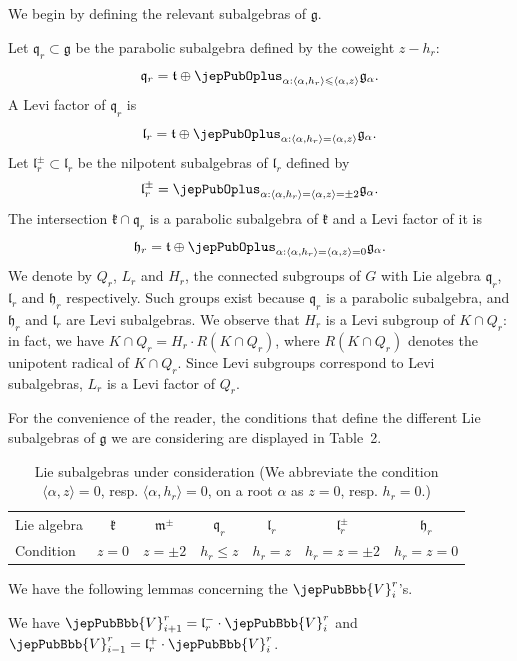 We begin by defining the relevant subalgebras of $\mathfrak g$.
\begin{notation}
Let $\mathfrak q_r\subset\mathfrak g$ be the parabolic subalgebra defined by the coweight $z-h_r$:
\[
\mathfrak q_r=\mathfrak t\oplus\jepPubOplus_{\alpha:\langle\alpha,h_r\rangle\leqslant\langle\alpha,z\rangle}\mathfrak g_\alpha.
\]
A Levi factor of $\mathfrak q_r$ is
\[
\mathfrak l_r=\mathfrak t\oplus\jepPubOplus_{\alpha:\langle\alpha,h_r\rangle=\langle\alpha,z\rangle}\mathfrak g_\alpha.
\]
Let $\mathfrak l_r^\pm\subset\mathfrak l_r$ be the nilpotent subalgebras of $\mathfrak l_r$ defined by
\[
\mathfrak l_r^\pm=\jepPubOplus_{\alpha:\langle\alpha,h_r\rangle=\langle\alpha,z\rangle=\pm2}\mathfrak g_\alpha.
\]
The intersection $\mathfrak k\cap\mathfrak q_r$ is a parabolic subalgebra of $\mathfrak k$ and a Levi factor of it is
\[
\mathfrak h_r=\mathfrak t\oplus\jepPubOplus_{\alpha:\langle\alpha,h_r\rangle=\langle\alpha,z\rangle=0}\mathfrak g_\alpha.
\]
We denote by $Q_r$, $L_r$ and $H_r$, the connected subgroups of $G$ with Lie algebra $\mathfrak q_r$, $\mathfrak l_r$ and $\mathfrak h_r$ respectively. Such groups exist because $\mathfrak q_r$ is a parabolic subalgebra, and $\mathfrak h_r$ and $\mathfrak l_r$ are Levi subalgebras. We observe that $H_r$ is a Levi subgroup of $K\cap Q_r$: in fact, we have $K\cap Q_r=H_r\cdot R(K\cap Q_r)$, where $R(K\cap Q_r)$ denotes the unipotent radical of $K\cap Q_r$. Since Levi subgroups correspond to Levi subalgebras, $L_r$ is a Levi factor of $Q_r$.
\end{notation}
For the convenience of the reader, the conditions that define the different Lie subalgebras of $\mathfrak g$ we are considering are displayed in Table~2.
\begin{table}[H]\centering
\begin{tabular}{lcccccc}\hline
Lie algebra & $\mathfrak k$ & $\mathfrak m^\pm$ & $\mathfrak q_r$ & $\mathfrak l_r$ & $\mathfrak l_r^\pm$ & $\mathfrak h_r$\\
Condition & $z=0$ & $z=\pm2$ & $h_r\leqslant z$ & $h_r=z$ & $h_r=z=\pm2$ & $h_r=z=0$\\\hline
\end{tabular}
\caption{\small Lie subalgebras under consideration (We abbreviate the condition $\langle\alpha,z\rangle=0$, resp. $\langle\alpha,h_r\rangle=0$, on a root $\alpha$ as $z=0$, resp. $h_r=0$.)}
\end{table}
We have the following lemmas concerning the $\jepPubBbb{V}^r_i$’s.
\begin{lemma}
We have $\jepPubBbb{V}^r_{i+1}=\mathfrak l_r^-\cdot\jepPubBbb{V}^r_i$ and $\jepPubBbb{V}^r_{i-1}=\mathfrak l_r^+\cdot\jepPubBbb{V}^r_i$.
\end{lemma}
